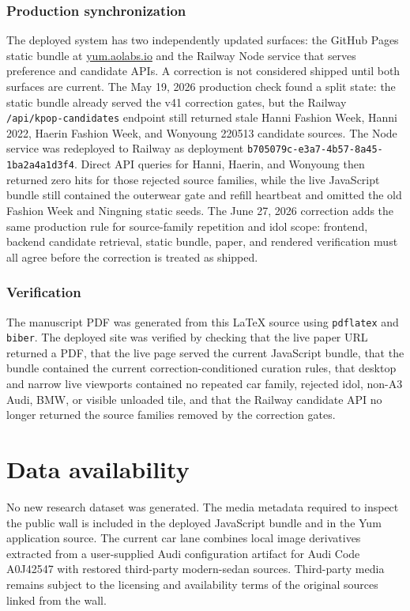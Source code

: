 \documentclass[12pt,letterpaper]{article}
\newcommand{\backmattersection}[1]{\section*{#1}\markboth{#1}{}}
\begin{document}
\subsubsection*{Production synchronization}

The deployed system has two independently updated surfaces: the GitHub Pages static bundle at \href{https://yum.aolabs.io}{yum.aolabs.io} and the Railway Node service that serves preference and candidate APIs. A correction is not considered shipped until both surfaces are current. The May 19, 2026 production check found a split state: the static bundle already served the v41 correction gates, but the Railway \texttt{/api/kpop-candidates} endpoint still returned stale Hanni Fashion Week, Hanni 2022, Haerin Fashion Week, and Wonyoung 220513 candidate sources. The Node service was redeployed to Railway as deployment \texttt{b705079c-e3a7-4b57-8a45-1ba2a4a1d3f4}. Direct API queries for Hanni, Haerin, and Wonyoung then returned zero hits for those rejected source families, while the live JavaScript bundle still contained the outerwear gate and refill heartbeat and omitted the old Fashion Week and Ningning static seeds. The June 27, 2026 correction adds the same production rule for source-family repetition and idol scope: frontend, backend candidate retrieval, static bundle, paper, and rendered verification must all agree before the correction is treated as shipped.

\subsubsection*{Verification}

The manuscript PDF was generated from this LaTeX source using \texttt{pdflatex} and \texttt{biber}. The deployed site was verified by checking that the live paper URL returned a PDF, that the live page served the current JavaScript bundle, that the bundle contained the current correction-conditioned curation rules, that desktop and narrow live viewports contained no repeated car family, rejected idol, non-A3 Audi, BMW, or visible unloaded tile, and that the Railway candidate API no longer returned the source families removed by the correction gates.

\backmattersection{Data availability}

No new research dataset was generated. The media metadata required to inspect the public wall is included in the deployed JavaScript bundle and in the Yum application source. The current car lane combines local image derivatives extracted from a user-supplied Audi configuration artifact for Audi Code A0J42547 with restored third-party modern-sedan sources. Third-party media remains subject to the licensing and availability terms of the original sources linked from the wall.
\end{document}
